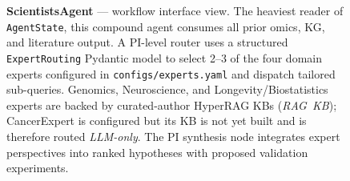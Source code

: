 \begin{figure}[htbp]
{\begin{tikzpicture}
\end{tikzpicture}%
}%
\caption{\textbf{ScientistsAgent} --- workflow interface view.
The heaviest reader of \texttt{AgentState}, this compound agent
consumes all prior omics, KG, and literature output.  A PI-level
router uses a structured \texttt{ExpertRouting} Pydantic model to
select 2--3 of the four domain experts configured in
\texttt{configs/experts.yaml} and dispatch tailored sub-queries.
Genomics, Neuroscience, and Longevity/Biostatistics experts are
backed by curated-author HyperRAG KBs (\emph{RAG~KB}); CancerExpert
is configured but its KB is not yet built and is therefore routed
\emph{LLM-only}.  The PI synthesis node integrates expert
perspectives into ranked hypotheses with proposed validation
experiments.}
\label{fig:closeup-scientists}
\end{figure}
